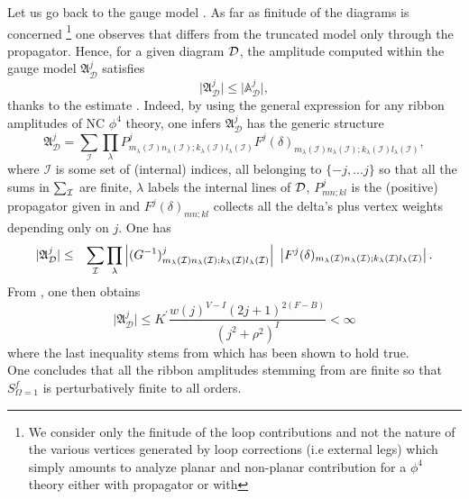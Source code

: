\documentclass[10pt]{book}
\theoremstyle{break}
\begin{document}
Let us go back to the gauge model %
. As far as finitude of the diagrams is concerned%
{\footnote{We consider only the finitude of the loop contributions and not the nature of the various vertices generated by loop corrections (i.e external legs) which simply amounts to analyze planar and non-planar contribution for a $\phi^4$ theory either with propagator %
or with %
}}
one observes that %
differs from the truncated model only through the propagator. Hence, for a given diagram ${\cal{D}}$, the amplitude computed within the gauge model %
$\mathfrak{A}^j_{\mathcal{D}}$ satisfies 
\begin{equation}
\vert \mathfrak{A}^j_{\mathcal{D}}\vert\le \vert \mathbb{A}^j_{\mathcal{D}}\vert,
\end{equation}
thanks to the estimate %
. Indeed, by using the general expression for any ribbon amplitudes of NC $\phi^4$ theory, one infers $\mathfrak{A}^j_{\mathcal{D}}$ has the generic structure%
%
\begin{equation}
\mathfrak{A}^j_{\mathcal{D}} = \sum_{\mathcal{I}} \prod_\lambda P^j_{m_\lambda(\mathcal{I}) n_\lambda(\mathcal{I});k_\lambda(\mathcal{I}) l_\lambda(\mathcal{I})} F^j(\delta)_{m_\lambda(\mathcal{I}) n_\lambda(\mathcal{I});k_\lambda(\mathcal{I}) l_\lambda(\mathcal{I})},%
\end{equation}
%
where $\mathcal{I}$ is some set of (internal) indices, all belonging to $\{-j,...j\}$ so that all the sums in $\sum_{{\cal{I}}}$ are finite, $\lambda$ labels the internal lines of ${\cal{D}}$, $P^j_{mn;kl}$ is the (positive) propagator given in %
and $F^j(\delta)_{mn;kl}$ collects all the delta's plus vertex weights depending only on $j$. One has%
%
\begin{eqnarray}
\vert\mathfrak{A}^j_{\mathcal{D}}\vert &\le& \sum_{\mathcal{I}} \prod_\lambda \left|(G^{-1})^j_{m_\lambda(\mathcal{I}) n_\lambda(\mathcal{I}) ; k_\lambda(\mathcal{I}) l_\lambda(\mathcal{I})} \right| \ \left| F^j(\delta)_{m_\lambda({\cal{I}}) n_\lambda({\cal{I}});k_\lambda({\cal{I}}) l_\lambda({\cal{I}})} \right|.
\end{eqnarray}
%
From %
, one then obtains
\begin{equation}
\vert\mathfrak{A}^j_{\mathcal{D}}\vert \le K^\prime\frac{w(j)^{V-I}(2j+1)^{2(F-B)}}{(j^2+\rho^2)^I}< \infty
\end{equation}
where the last inequality stems from %
which has been shown to hold true.\\
One concludes that all the ribbon amplitudes stemming from %
are finite so that $S^f_{\Omega=1}$ is perturbatively finite to all orders.\par%
\end{document}
